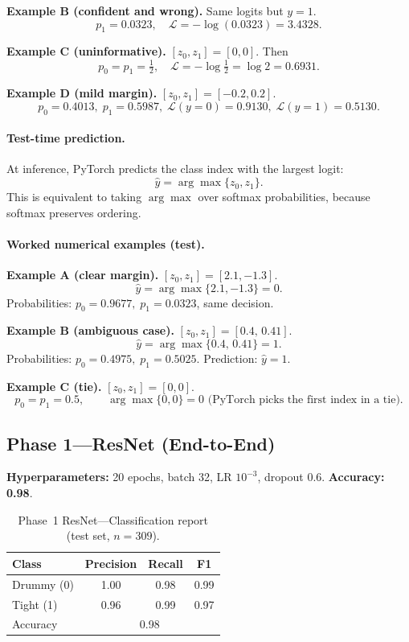 \documentclass{article}
\begin{document}
\noindent
\textbf{Example B (confident and wrong).} Same logits but \(y=1\).
\[
p_1=0.0323,\quad \mathcal{L}=-\log(0.0323)=3.4328.
\]

\noindent
\textbf{Example C (uninformative).} \([z_0,z_1]=[0,0]\). Then
\[
p_0=p_1=\tfrac{1}{2},\quad \mathcal{L}=-\log\tfrac{1}{2}=\log 2=0.6931.
\]

\noindent
\textbf{Example D (mild margin).} \([z_0,z_1]=[-0.2,0.2]\).
\[
p_0=0.4013,\; p_1=0.5987,\;
\mathcal{L}(y{=}0)=0.9130,\;\mathcal{L}(y{=}1)=0.5130.
\]

\paragraph{Test-time prediction.}
At inference, PyTorch predicts the class index with the largest logit:
\[
\hat{y}=\arg\max\{z_0, z_1\}.
\]
This is equivalent to taking \(\arg\max\) over softmax probabilities, because softmax preserves ordering.

\paragraph{Worked numerical examples (test).}
\textbf{Example A (clear margin).} \([z_0,z_1]=[2.1,-1.3]\).
\[
\hat{y}=\arg\max\{2.1,-1.3\}=0.
\]
Probabilities: \(p_0=0.9677,\; p_1=0.0323\), same decision.

\noindent
\textbf{Example B (ambiguous case).} \([z_0,z_1]=[0.4,\,0.41]\).
\[
\hat{y}=\arg\max\{0.4,\,0.41\}=1.
\]
Probabilities: \(p_0=0.4975,\; p_1=0.5025\). Prediction: \(\hat{y}=1\).

\noindent
\textbf{Example C (tie).} \([z_0,z_1]=[0,0]\).
\[
p_0=p_1=0.5,\qquad \arg\max\{0,0\}=0 \text{ (PyTorch picks the first index in a tie).}
\]




\FloatBarrier
\newpage
\subsection{Phase 1—ResNet (End-to-End)}
\textbf{Hyperparameters:} 20 epochs, batch 32, LR \(10^{-3}\), dropout 0.6.  
\textbf{Accuracy:} \textbf{0.98}.
\begin{table}[h]
\centering
\caption{Phase~1 ResNet—Classification report (test set, $n{=}309$).}
\begin{tabular}{lccc}
\toprule
Class & Precision & Recall & F1 \\
\midrule
Drummy (0) & 1.00 & 0.98 & 0.99 \\
Tight (1)  & 0.96 & 0.99 & 0.97 \\
\midrule
Accuracy   & \multicolumn{3}{c}{0.98} \\
\bottomrule
\end{tabular}
\end{table}
\end{document}
